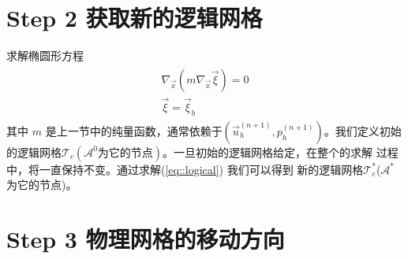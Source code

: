 \documentclass{report}
\theoremstyle{Remark}
\begin{document}
   \section{Step 2 获取新的逻辑网格}
     求解椭圆形方程
     \begin{eqnarray}
       \begin{aligned}
         \nabla_{\vec{x}} \left ( m \nabla_{\vec{x}} \vec{\xi} \right)
         = 0 \\
         \vec{\xi} = \vec{\xi}_b 
       \end{aligned}
       \label{eq::logical}
     \end{eqnarray}
     其中 $m$ 是上一节中的纯量函数，通常依赖于$(\vec{u}_h^{(n + 1)},
     p_h^{(n + 1)})$。我们定义初始的逻辑网格$\mathcal{T}_c (\mathcal
     {A}^{0} \text{为它的节点})$。一旦初始的逻辑网格给定，在整个的求解
     过程中，将一直保持不变。通过求解(\ref{eq::logical}) 我们可以得到
     新的逻辑网格$\mathcal{T}_c^*$($\mathcal{A}^*$为它的节点)。
  \section{Step 3 物理网格的移动方向}
    
\end{document}
